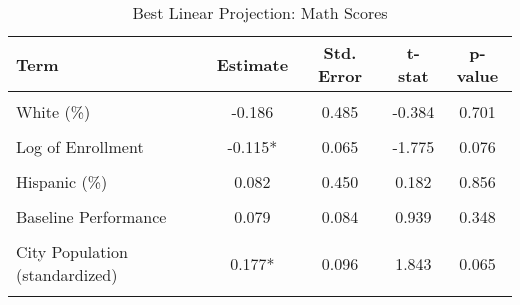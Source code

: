 \begin{table}[!h]
\centering
\caption{\label{tab:blp_math}Best Linear Projection: Math Scores}
\centering
\begin{tabular}[t]{lcccc}
\toprule
Term & Estimate & Std. Error & t-stat & p-value\\
\midrule
\cellcolor{gray!10}{(Intercept)} & \cellcolor{gray!10}{1.389} & \cellcolor{gray!10}{0.911} & \cellcolor{gray!10}{1.525} & \cellcolor{gray!10}{0.127}\\
White (\%) & -0.186 & 0.485 & -0.384 & 0.701\\
\cellcolor{gray!10}{Black (\%)} & \cellcolor{gray!10}{0.097} & \cellcolor{gray!10}{0.568} & \cellcolor{gray!10}{0.170} & \cellcolor{gray!10}{0.865}\\
Log of Enrollment & -0.115* & 0.065 & -1.775 & 0.076\\
\cellcolor{gray!10}{Magnet Schools (\%)} & \cellcolor{gray!10}{0.007} & \cellcolor{gray!10}{0.005} & \cellcolor{gray!10}{1.433} & \cellcolor{gray!10}{0.152}\\
Hispanic (\%) & 0.082 & 0.450 & 0.182 & 0.856\\
\cellcolor{gray!10}{TPS-Charter Spending (\% diff)} & \cellcolor{gray!10}{0.211} & \cellcolor{gray!10}{0.193} & \cellcolor{gray!10}{1.093} & \cellcolor{gray!10}{0.274}\\
Baseline Performance & 0.079 & 0.084 & 0.939 & 0.348\\
\cellcolor{gray!10}{Free/Reduced Lunch (\%)} & \cellcolor{gray!10}{0.024} & \cellcolor{gray!10}{0.428} & \cellcolor{gray!10}{0.056} & \cellcolor{gray!10}{0.955}\\
City Population (standardized) & 0.177* & 0.096 & 1.843 & 0.065\\
\cellcolor{gray!10}{Per Pupil Revenue} & \cellcolor{gray!10}{0} & \cellcolor{gray!10}{0.000} & \cellcolor{gray!10}{-1.396} & \cellcolor{gray!10}{0.163}\\
\bottomrule
\end{tabular}
\end{table}
